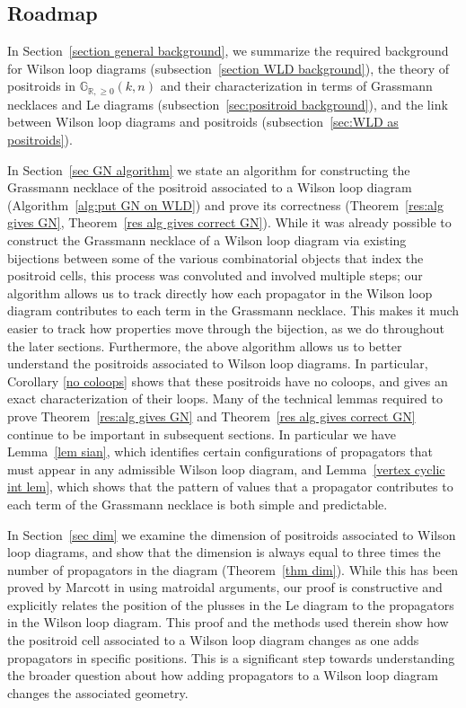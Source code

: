 \documentclass[11pt]{article}
\newcommand{\R}{\mathbb{R}}
\newcommand{\Gr}{\mathbb{G}_{\R, \geq 0}}
\theoremstyle{remark}
\theoremstyle{definition}
\begin{document}
\subsection{Roadmap}

In Section~\ref{section general background}, we summarize the required background for Wilson loop diagrams (subsection~\ref{section WLD background}), the theory of positroids in $\Gr(k,n)$ and their characterization in terms of Grassmann necklaces and Le diagrams (subsection~\ref{sec:positroid background}), and the link between Wilson loop diagrams and positroids (subsection~\ref{sec:WLD as positroids}). 

In Section~\ref{sec GN algorithm} we state an algorithm for constructing the Grassmann necklace of the positroid associated to a Wilson loop diagram (Algorithm~\ref{alg:put GN on WLD}) and prove its correctness (Theorem~\ref{res:alg gives GN}, Theorem~\ref{res alg gives correct GN}). While it was already possible to construct the Grassmann necklace of a Wilson loop diagram via existing bijections between some of the various combinatorial objects that index the positroid cells, this process was convoluted and involved multiple steps; our algorithm allows us to track directly how each propagator in the Wilson loop diagram contributes to each term in the Grassmann necklace. This makes it much easier to track how properties move through the bijection, as we do throughout the later sections. Furthermore, the above algorithm allows us to better understand the positroids associated to Wilson loop diagrams. In particular, Corollary \ref{no coloops} shows that these positroids have no coloops, and gives an exact characterization of their loops. Many of the technical lemmas required to prove Theorem~\ref{res:alg gives GN} and Theorem~\ref{res alg gives correct GN} continue to be important in subsequent sections.  In particular we have Lemma~\ref{lem sian}, which identifies certain configurations of propagators that must appear in any admissible Wilson loop diagram, and Lemma~\ref{vertex cyclic int lem}, which shows that the pattern of values that a propagator contributes to each term of the Grassmann necklace is both simple and predictable.

In Section~\ref{sec dim} we examine the dimension of positroids associated to Wilson loop diagrams, and show that the dimension is always equal to three times the number of propagators in the diagram (Theorem~\ref{thm dim}).  While this has been proved by Marcott in \cite{WLDdim} using matroidal arguments, our proof is constructive and explicitly relates the position of the plusses in the Le diagram to the propagators in the Wilson loop diagram. This proof and the methods used therein show how the positroid cell associated to a Wilson loop diagram changes as one adds propagators in specific positions. This is a significant step towards understanding the broader question about how adding propagators to a Wilson loop diagram changes the associated geometry.
\end{document}
